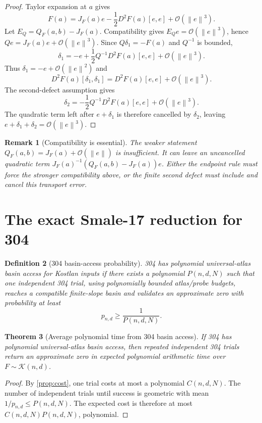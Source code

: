 \documentclass[11pt]{article}
\newtheorem{definition}{Definition}[section]
\newtheorem{theorem}[definition]{Theorem}
\newtheorem{remark}[definition]{Remark}
\newcommand{\K}{\mathcal K}
\newcommand{\OO}{\mathcal O}
\newcommand{\norm}[1]{\left\lVert #1\right\rVert}
\begin{document}
\begin{proof}
Taylor expansion at $a$ gives
\[
        F(a)=J_F(a)e-\frac12D^2F(a)[e,e]+\OO(\norm e^3).
\]
Let $E_Q=Q_F(a,b)-J_F(a)$.  Compatibility gives $E_Qe=\OO(\norm e^3)$, hence $Qe=J_F(a)e+\OO(\norm e^3)$.  Since $Q\delta_1=-F(a)$ and $Q^{-1}$ is bounded,
\[
        \delta_1=-e+\frac12Q^{-1}D^2F(a)[e,e]+\OO(\norm e^3).
\]
Thus $\delta_1=-e+\OO(\norm e^2)$ and
\[
        D^2F(a)[\delta_1,\delta_1]=D^2F(a)[e,e]+\OO(\norm e^3).
\]
The second-defect assumption gives
\[
        \delta_2=-\frac12Q^{-1}D^2F(a)[e,e]+\OO(\norm e^3).
\]
The quadratic term left after $e+\delta_1$ is therefore cancelled by $\delta_2$, leaving $e+\delta_1+\delta_2=\OO(\norm e^3)$.
\end{proof}

\begin{remark}[Compatibility is essential]
The weaker statement $Q_F(a,b)=J_F(a)+\OO(\norm e)$ is insufficient.  It can leave an uncancelled quadratic term $J_F(a)^{-1}(Q_F(a,b)-J_F(a))e$.  Either the endpoint rule must force the stronger compatibility above, or the finite second defect must include and cancel this transport error.
\end{remark}

\section{The exact Smale-17 reduction for 304}

\begin{definition}[304 basin-access probability]\label{def:access}
304 has polynomial universal-atlas basin access for Kostlan inputs if there exists a polynomial $P(n,d,N)$ such that one independent 304 trial, using polynomially bounded atlas/probe budgets, reaches a compatible finite-slope basin and validates an approximate zero with probability at least
\[
        p_{n,d}\ge \frac1{P(n,d,N)}.
\]
\end{definition}

\begin{theorem}[Average polynomial time from 304 basin access]\label{thm:expected}
If 304 has polynomial universal-atlas basin access, then repeated independent 304 trials return an approximate zero in expected polynomial arithmetic time over $F\sim\K(n,d)$.
\end{theorem}

\begin{proof}
By \cref{prop:cost}, one trial costs at most a polynomial $C(n,d,N)$.  The number of independent trials until success is geometric with mean $1/p_{n,d}\le P(n,d,N)$.  The expected cost is therefore at most $C(n,d,N)P(n,d,N)$, polynomial.
\end{proof}
\end{document}
